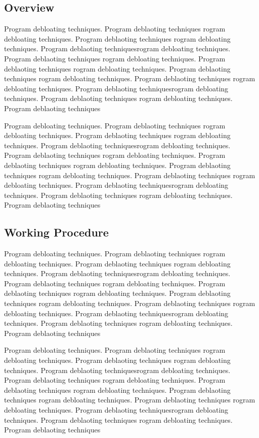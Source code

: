 \documentclass{relatorio}
\begin{document}
\subsection{Overview}%
\label{Tools}

Program debloating techniques. Program deblaoting techniques rogram debloating techniques. Program deblaoting techniques
rogram debloating techniques. Program deblaoting techniquesrogram debloating techniques. Program deblaoting techniques
rogram debloating techniques. Program deblaoting techniques rogram debloating techniques. Program deblaoting techniques
rogram debloating techniques. Program deblaoting techniques 
rogram debloating techniques. Program deblaoting techniquesrogram debloating techniques. Program deblaoting techniques
rogram debloating techniques. Program deblaoting techniques

Program debloating techniques. Program deblaoting techniques rogram debloating techniques. Program deblaoting techniques
rogram debloating techniques. Program deblaoting techniquesrogram debloating techniques. Program deblaoting techniques
rogram debloating techniques. Program deblaoting techniques rogram debloating techniques. Program deblaoting techniques
rogram debloating techniques. Program deblaoting techniques 
rogram debloating techniques. Program deblaoting techniquesrogram debloating techniques. Program deblaoting techniques
rogram debloating techniques. Program deblaoting techniques


\subsection{Working Procedure}%
\label{Tools}

Program debloating techniques. Program deblaoting techniques rogram debloating techniques. Program deblaoting techniques
rogram debloating techniques. Program deblaoting techniquesrogram debloating techniques. Program deblaoting techniques
rogram debloating techniques. Program deblaoting techniques rogram debloating techniques. Program deblaoting techniques
rogram debloating techniques. Program deblaoting techniques 
rogram debloating techniques. Program deblaoting techniquesrogram debloating techniques. Program deblaoting techniques
rogram debloating techniques. Program deblaoting techniques

Program debloating techniques. Program deblaoting techniques rogram debloating techniques. Program deblaoting techniques
rogram debloating techniques. Program deblaoting techniquesrogram debloating techniques. Program deblaoting techniques
rogram debloating techniques. Program deblaoting techniques rogram debloating techniques. Program deblaoting techniques
rogram debloating techniques. Program deblaoting techniques 
rogram debloating techniques. Program deblaoting techniquesrogram debloating techniques. Program deblaoting techniques
rogram debloating techniques. Program deblaoting techniques
\end{document}
